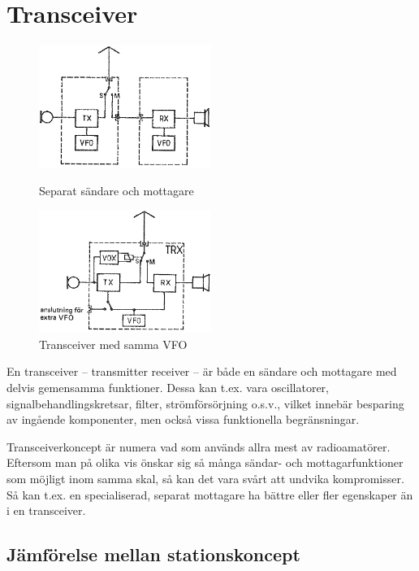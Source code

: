\section{Transceiver}

\begin{figure}
  \includegraphics[width=0.5\textwidth]{images/bild_2_5-09.png}
  \caption{Separat sändare och mottagare}
  \label{fig:bildII5-9}

  \includegraphics[width=0.5\textwidth]{images/bild_2_5-10.png}
  \caption{Transceiver med samma VFO}
  \label{fig:bildII5-10}
\end{figure}

En transceiver -- transmitter receiver -- är både en sändare och
mottagare med delvis gemensamma funktioner. Dessa kan t.ex.  vara
oscillatorer, signalbehandlingskretsar, filter, strömförsörjning
o.s.v., vilket innebär besparing av ingående komponenter, men också
vissa funktionella begränsningar.

Transceiverkoncept är numera vad som används allra mest av
radioamatörer. Eftersom man på olika vis önskar sig så många sändar-
och mottagarfunktioner som möjligt inom samma skal, så kan det vara
svårt att undvika kompromisser. Så kan t.ex. en specialiserad, separat
mottagare ha bättre eller fler egenskaper än i en transceiver.

\subsection{Jämförelse mellan stationskoncept}

